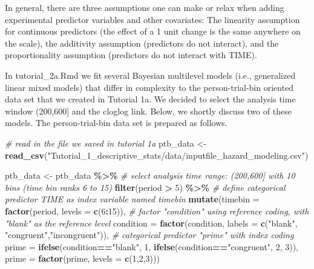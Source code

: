 \documentclass[
  man, donotrepeattitle,floatsintext]{apa6}
\newenvironment{Shaded}{\begin{snugshade}}{\end{snugshade}}
\newcommand{\AttributeTok}[1]{\textcolor[rgb]{0.13,0.29,0.53}{#1}}
\newcommand{\CommentTok}[1]{\textcolor[rgb]{0.56,0.35,0.01}{\textit{#1}}}
\newcommand{\DecValTok}[1]{\textcolor[rgb]{0.00,0.00,0.81}{#1}}
\newcommand{\FunctionTok}[1]{\textcolor[rgb]{0.13,0.29,0.53}{\textbf{#1}}}
\newcommand{\NormalTok}[1]{#1}
\newcommand{\OtherTok}[1]{\textcolor[rgb]{0.56,0.35,0.01}{#1}}
\newcommand{\SpecialCharTok}[1]{\textcolor[rgb]{0.81,0.36,0.00}{\textbf{#1}}}
\newcommand{\StringTok}[1]{\textcolor[rgb]{0.31,0.60,0.02}{#1}}
\begin{document}
In general, there are three assumptions one can make or relax when adding experimental predictor variables and other covariates: The linearity assumption for continuous predictors (the effect of a 1 unit change is the same anywhere on the scale), the additivity assumption (predictors do not interact), and the proportionality assumption (predictors do not interact with TIME).

In tutorial\_2a.Rmd we fit several Bayesian multilevel models (i.e., generalized linear mixed models) that differ in complexity to the person-trial-bin oriented data set that we created in Tutorial 1a. We decided to select the analysis time window (200,600{]} and the cloglog link. Below, we shortly discuss two of these models. The person-trial-bin data set is prepared as follows.

\footnotesize

\begin{Shaded}
\begin{Highlighting}[]
\CommentTok{\# read in the file we saved in tutorial 1a}
\NormalTok{ptb\_data }\OtherTok{\textless{}{-}} \FunctionTok{read\_csv}\NormalTok{(}\StringTok{"Tutorial\_1\_descriptive\_stats/data/inputfile\_hazard\_modeling.csv"}\NormalTok{)}

\NormalTok{ptb\_data }\OtherTok{\textless{}{-}}\NormalTok{ ptb\_data }\SpecialCharTok{\%\textgreater{}\%} 
\CommentTok{\# select analysis time range: (200,600] with 10 bins (time bin ranks 6 to 15)}
\FunctionTok{filter}\NormalTok{(period }\SpecialCharTok{\textgreater{}} \DecValTok{5}\NormalTok{) }\SpecialCharTok{\%\textgreater{}\%}
       \CommentTok{\# define categorical predictor TIME as index variable named timebin}
\FunctionTok{mutate}\NormalTok{(}\AttributeTok{timebin =} \FunctionTok{factor}\NormalTok{(period, }\AttributeTok{levels =} \FunctionTok{c}\NormalTok{(}\DecValTok{6}\SpecialCharTok{:}\DecValTok{15}\NormalTok{)),}
       \CommentTok{\# factor "condition" using reference coding, with "blank" as the reference level}
       \AttributeTok{condition =} \FunctionTok{factor}\NormalTok{(condition, }\AttributeTok{labels =} \FunctionTok{c}\NormalTok{(}\StringTok{"blank"}\NormalTok{, }\StringTok{"congruent"}\NormalTok{,}\StringTok{"incongruent"}\NormalTok{)),}
       \CommentTok{\# categorical predictor "prime" with index coding}
       \AttributeTok{prime =} \FunctionTok{ifelse}\NormalTok{(condition}\SpecialCharTok{==}\StringTok{"blank"}\NormalTok{, }\DecValTok{1}\NormalTok{, }\FunctionTok{ifelse}\NormalTok{(condition}\SpecialCharTok{==}\StringTok{"congruent"}\NormalTok{, }\DecValTok{2}\NormalTok{, }\DecValTok{3}\NormalTok{)),}
       \AttributeTok{prime =} \FunctionTok{factor}\NormalTok{(prime, }\AttributeTok{levels =} \FunctionTok{c}\NormalTok{(}\DecValTok{1}\NormalTok{,}\DecValTok{2}\NormalTok{,}\DecValTok{3}\NormalTok{)))}
\end{Highlighting}
\end{Shaded}
\end{document}
